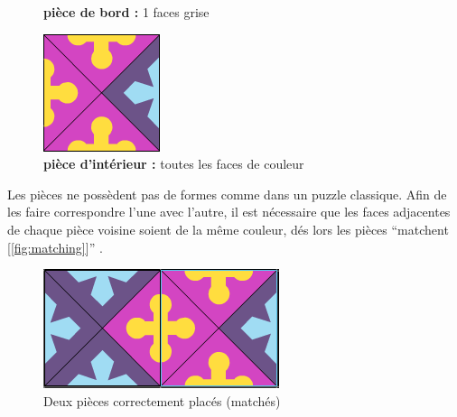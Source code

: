 \begin{figure}[H]
	   	\caption{\textbf{pièce de bord :} 1 faces grise}\label{fig:piece_bord}
	   	\endminipage\hfill
	   	\includegraphics[width=\linewidth]{images/piece_interieure.png}
	   	\caption{\textbf{pièce d'intérieur :} toutes les faces de couleur}\label{fig:piece_interieure}
	   	\endminipage
	\end{figure}

	Les pièces ne possèdent pas de formes comme dans un puzzle classique. Afin de les faire correspondre l'une avec l'autre, il est nécessaire que les faces adjacentes de chaque pièce voisine soient de la même couleur, dés lors les pièces \enquote{matchent [\autoref{fig:matching}]} .
	
	\begin{figure}[H]
		\centering
		\includegraphics{images/matching_pieces.png}
		\caption{Deux pièces correctement placés (matchés)}\label{fig:matching}
	\end{figure}
	
